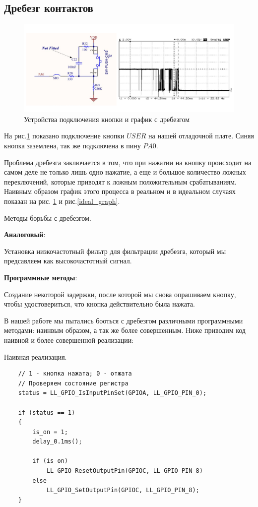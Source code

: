 \subsection{Дребезг контактов}


\begin{figure}[h!]
		\centering
		\includegraphics[width=1\linewidth]{pics/drebezg.png}
		\caption{Устройства подключения кнопки и график с дребезгом}
		\label{drebezg}
\end{figure}

На рис.\ref{drebezg} показано подключение кнопки $USER$ на нашей отладочной плате.
Синяя кнопка заземлена, так же подключена в пину $PA0$. 
	
	
Проблема дребезга заключается в том, что при нажатии на кнопку происходит на самом деле не только лишь одно нажатие, а еще и большое количество ложных переключений, которые приводят к ложным положительным срабатываниям. Наивным образом график этого процесса в реальном и в идеальном случаях показан на рис. \ref{drebezg} и рис.\ref{ideal_graph}.

Методы борьбы с дребезгом.

\textbf{Аналоговый}:

Установка низкочастотный фильтр для фильтрации дребезга, который мы предсавляем как высокочастотный сигнал.

\textbf{Программные методы}:

Создание некоторой задержки, после которой мы снова опрашиваем кнопку, чтобы удостовериться, что кнопка действительно была нажата.


В нашей работе мы пытались бооться с дребезгом различными программными методами: наинвым образом, а так же более совершенным. Ниже приводим код наивной и более совершенной реализации:


    Наивная реализация.
\begin{verbatim}
    // 1 - кнопка нажата; 0 - отжата
    // Проверяем состояние регистра
    status = LL_GPIO_IsInputPinSet(GPIOA, LL_GPIO_PIN_0); 
    
    if (status == 1) 
    {   
        is_on = 1;
        delay_0.1ms();
        
        if (is on)
            LL_GPIO_ResetOutputPin(GPIOC, LL_GPIO_PIN_8) 
        else 
            LL_GPIO_SetOutputPin(GPIOC, LL_GPIO_PIN_8);
    }
\end{verbatim}
    
